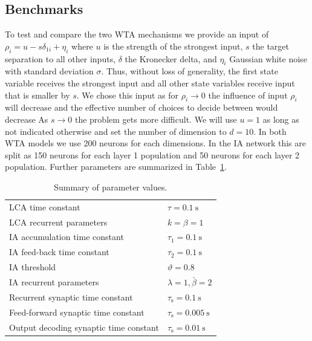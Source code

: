 \documentclass[10pt,letterpaper]{article}
\begin{document}
\subsection{Benchmarks}
To test and compare the two WTA mechanisms we provide an input of $\rho_i 
= u - s \delta_{1i} + \eta_i$ where $u$ is the strength of the strongest input, 
$s$ the target separation to all other inputs, $\delta$ the Kronecker delta, and $\eta_i$ Gaussian white noise with standard deviation $\sigma$.
Thus, without loss of generality, the first state variable receives the strongest input and all other state variables receive input that is smaller by $s$.
We chose this input as for $\rho_i \rightarrow 0$ the influence of input $\rho_i$ will decrease and the effective number of choices to decide between would decrease As $s \rightarrow 0$ the problem gets more difficult.
We will use $u = 1$ as long as not indicated otherwise and set the number of dimension to $d = 10$.
In both WTA models we use 200 neurons for each dimensions.
In the IA network this are split as 150 neurons for each layer 1 population and 50 neurons for each layer 2 population.
Further parameters are summarized in Table~\ref{tbl:params}.
\begin{table}
    \caption{Summary of parameter values.}\label{tbl:params}
    \begin{tabular}{ll}
        LCA time constant & $\tau = \SI{0.1}{\second}$ \\
        LCA recurrent parameters & $k = \beta = 1$ \\
        IA accumulation time constant & $\tau_1 = \SI{0.1}{\second}$ \\
        IA feed-back time constant & $\tau_2 = \SI{0.1}{\second}$ \\
        IA threshold & $\vartheta = 0.8$ \\
        IA recurrent parameters & $\lambda = 1, \bar{\beta} = 2$ \\
        Recurrent synaptic time constant & $\tau_{\mathrm{s}} 
        = \SI{0.1}{\second}$ \\
        Feed-forward synaptic time constant & $\tau_{\mathrm{s}} 
        = \SI{0.005}{\second}$ \\
        Output decoding synaptic time constant & $\tau_{\mathrm{s}} 
        = \SI{0.01}{\second}$
    \end{tabular}
\end{table}
\end{document}
